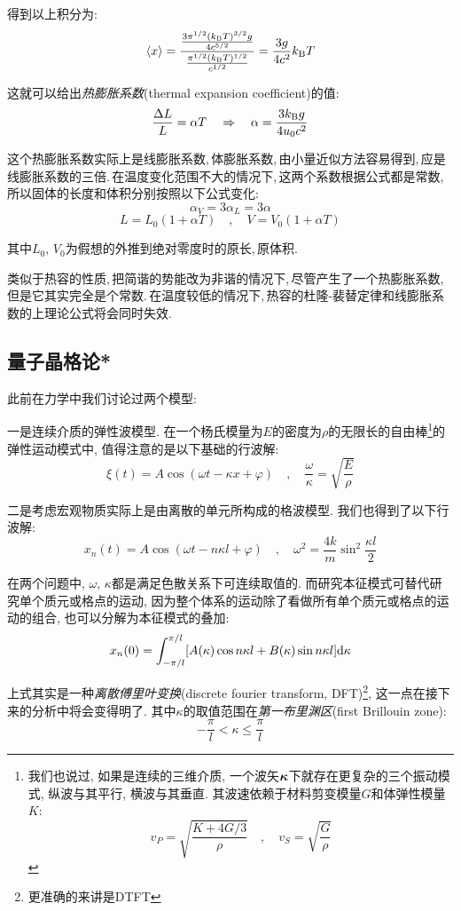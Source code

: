 得到以上积分为:
\[\langle x\rangle=\frac{\frac{3\pi^{1/2}(k_{\rm B}T)^{3/2}g}{4c^{5/2}}}{\frac{\pi^{1/2}(k_{\rm B}T)^{1/2}}{c^{1/2}}}=\frac{3g}{4c^2}k_{\rm B}T\]

这就可以给出\emph{热膨胀系数}(thermal expansion coefficient)的值:
\[\frac{\Delta L}{L}=\alpha T \quad\Rightarrow \quad \alpha=	\frac{3k_{\rm B}g}{4u_0c^2}\]

这个热膨胀系数实际上是线膨胀系数,\,体膨胀系数,\,由小量近似方法容易得到,\,应是线膨胀系数的三倍.\,在温度变化范围不大的情况下,\,这两个系数根据公式都是常数,\,所以固体的长度和体积分别按照以下公式变化:
\[\alpha_V=3\alpha_L=3\alpha\]
\[L=L_0(1+\alpha T)\quad,\quad V=V_0(1+\alpha T)\]

其中$L_0,\,V_0$为假想的外推到绝对零度时的原长,\,原体积.

类似于热容的性质,\,把简谐的势能改为非谐的情况下,\,尽管产生了一个热膨胀系数,\,但是它其实完全是个常数.\,在温度较低的情况下,\,热容的杜隆-裴替定律和线膨胀系数的上理论公式将会同时失效.


\subsection{量子晶格论*}

此前在力学中我们讨论过两个模型:

一是连续介质的弹性波模型. 在一个杨氏模量为$E$的密度为$\rho$的无限长的自由棒\footnote{我们也说过, 如果是连续的三维介质, 一个波矢$\boldsymbol{\kappa}$下就存在更复杂的三个振动模式, 纵波与其平行, 横波与其垂直. 其波速依赖于材料剪变模量$G$和体弹性模量$K$:
\[v_P=\sqrt{\frac{K+4G/3}{\rho}}\quad ,\quad v_S=\sqrt{\frac{G}{\rho}}\]}的弹性运动模式中, 值得注意的是以下基础的行波解:
\[\xi(t)=A\cos(\omega t-\kappa x+\varphi)\quad ,\quad \frac{\omega}{\kappa}=\sqrt{\frac{E}{\rho}}\]

二是考虑宏观物质实际上是由离散的单元所构成的格波模型. 我们也得到了以下行波解:
\[x_n(t)=A\cos(\omega t-n\kappa l+\varphi)\quad ,\quad \omega^2=\frac{4k}{m}\sin^2\frac{\kappa l}{2}\]

在两个问题中, $\omega,\,\kappa$都是满足色散关系下可连续取值的. 而研究本征模式可替代研究单个质元或格点的运动, 因为整个体系的运动除了看做所有单个质元或格点的运动的组合, 也可以分解为本征模式的叠加:
\[x_n(0)=\int_{-\pi/l}^{\pi/l} [A(\kappa)\cos n\kappa l+B(\kappa)\sin n\kappa l]\textrm{d} \kappa\]

上式其实是一种\emph{离散傅里叶变换}(discrete fourier transform, DFT)\footnote{更准确的来讲是DTFT}, 这一点在接下来的分析中将会变得明了. 其中$\kappa$的取值范围在\emph{第一布里渊区}(first Brillouin zone):
\[-\frac{\pi}{l}<\kappa\leq \frac{\pi}{l}\]

